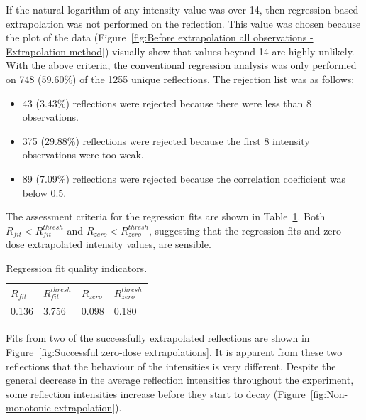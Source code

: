 If the natural logarithm of any intensity value was over 14, then regression based extrapolation was not performed on the reflection.
This value was chosen because the plot of the data (Figure~\ref{fig:Before extrapolation all observations - Extrapolation method}) visually show that values beyond 14 are highly unlikely.
With the above criteria, the conventional regression analysis was only performed on 748 (59.60\%) of the 1255 unique reflections.
The rejection list was as follows:
\begin{itemize}
    \item 43 (3.43\%) reflections were rejected because there were less than 8 observations.
    \item 375 (29.88\%) reflections were rejected because the first 8 intensity observations were too weak.
    \item 89 (7.09\%) reflections were rejected because the correlation coefficient was below 0.5.
\end{itemize}
The assessment criteria for the regression fits are shown in Table~\ref{tab:R_fit and R_zero values}.
Both $R_{fit} < R^{thresh}_{fit}$ and $R_{zero} < R^{thresh}_{zero}$, suggesting that the regression fits and zero-dose extrapolated intensity values, are sensible.
\begin{table}[ht!]
	\caption[Regression fit quality indicators.]{Regression fit quality indicators.}
	\centering
	\begin{tabular}{p{1.5cm} | p{1.5cm} | p{1.5cm} | p{1.5cm}}
		$R_{fit}$     & $R^{thresh}_{fit}$    & $R_{zero}$   & $R^{thresh}_{zero}$  \\
		\hline
		0.136        & 3.756                & 0.098       & 0.180        \\
	\end{tabular}
	\label{tab:R_fit and R_zero values}
\end{table}
Fits from two of the successfully extrapolated reflections are shown in Figure~\ref{fig:Successful zero-dose extrapolations}.
It is apparent from these two reflections that the behaviour of the intensities is very different.
Despite the general decrease in the average reflection intensities throughout the experiment, some reflection intensities increase before they start to decay (Figure~\ref{fig:Non-monotonic extrapolation}).
